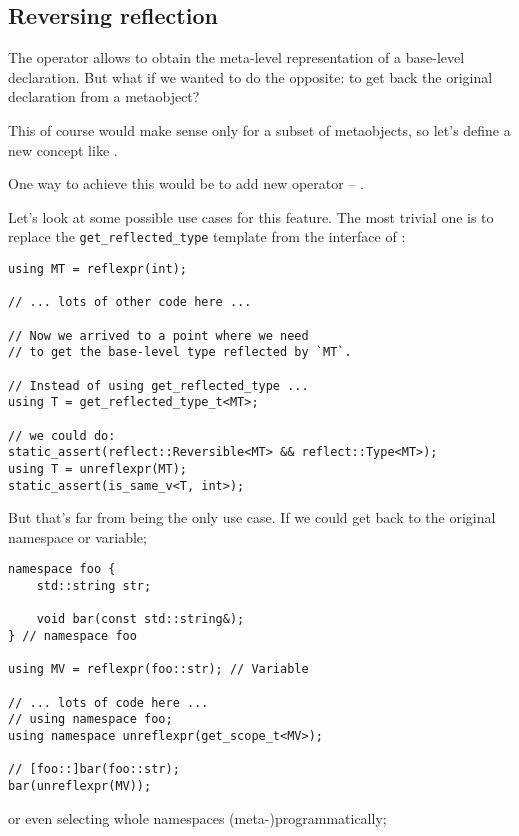 \subsection{Reversing reflection}
\label{fut-reverse-reflection}

The \verb@reflexpr@ operator allows to obtain the meta-level representation
of a base-level declaration. But what if we wanted to do the opposite: to
get back the original declaration from a metaobject?

This of course would make sense only for a subset of metaobjects, so let's
define a new concept like .

One way to achieve this would be to add new operator -- \verb@unreflexpr@.

Let's look at some possible use cases for this feature.
The most trivial one is to replace the \texttt{get\_reflected\_type}
template from the interface of :

\begin{verbatim}
using MT = reflexpr(int);

// ... lots of other code here ...

// Now we arrived to a point where we need
// to get the base-level type reflected by `MT`.

// Instead of using get_reflected_type ...
using T = get_reflected_type_t<MT>;

// we could do:
static_assert(reflect::Reversible<MT> && reflect::Type<MT>);
using T = unreflexpr(MT);
static_assert(is_same_v<T, int>);

\end{verbatim}

But that's far from being the only use case. If we could get back to
the original namespace or variable;

\begin{verbatim}
namespace foo {
	std::string str;

	void bar(const std::string&);
} // namespace foo

using MV = reflexpr(foo::str); // Variable

// ... lots of code here ...
// using namespace foo;
using namespace unreflexpr(get_scope_t<MV>);

// [foo::]bar(foo::str);
bar(unreflexpr(MV));

\end{verbatim}

or even selecting whole namespaces (meta-)programmatically;

